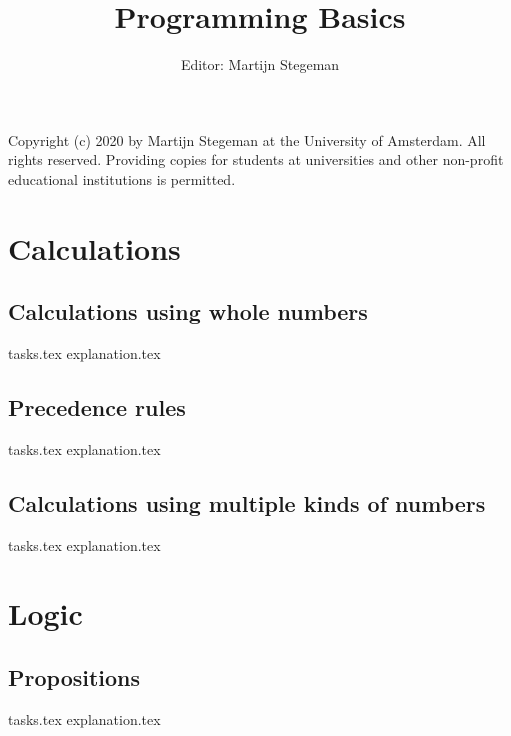 \def\doclang{english}
\def\langdir{en}




    \title{Programming Basics}
    \author{Editor: Martijn Stegeman}
    \maketitle

    Copyright (c) 2020 by Martijn Stegeman at the University of Amsterdam. All rights reserved. Providing copies for students at universities and other non-profit educational institutions is permitted.

    \tableofcontents

    \chapter{Calculations}
    \newpage

    \section{Calculations using whole numbers}
    {tasks.tex}          \newpage
    {explanation.tex}       \newpage

    \section{Precedence rules}
    {tasks.tex}        \newpage
    {explanation.tex}     \newpage

    \section{Calculations using multiple kinds of numbers}
    {tasks.tex}            \newpage
    {explanation.tex}         \newpage

    \chapter{Logic}
    \newpage

    \section{Propositions}
    {tasks.tex}         \newpage
    {explanation.tex}      \newpage

